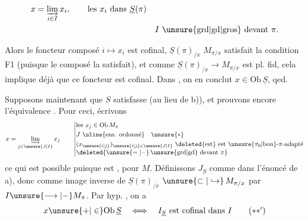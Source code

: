 
\[
\begin{aligned}
x&=\varinjlim_{i\in I}x_i,\qquad \text{les }x_i\text{ dans }\underline S(\pi)\\
&& I\ \unsure{\text{grd}|\text{gd}|\text{gros}}\text{ devant }\pi.
\end{aligned}
\]

Alors le foncteur composé $i\mapsto x_i$
est cofinal,   $\underline S(\pi)_{/x}$ \unsure{$-\!-$|$\longrightarrow$} $M_{\pi/x}$  satisfait la condition F1 (puisque le composé la satisfait), et comme $\underline S(\pi)_{/x}\longrightarrow M_{\pi/x}$ est pl. fid, cela implique déjà que ce foncteur est cofinal. Dans  , on en conclut $x\in\mathrm{Ob}\,\underline S$, qed.

Supposons maintenant que $S$ satisfasse  (au lieu de b)), et prouvons encore l'équivalence \unsure{$(*)$|$(**)$}. Pour ceci, écrivons
\[
 x=\varinjlim_{j\in\unsure{J|I}}x_j\qquad
 \left|\begin{aligned}
 &\text{les }x_j\in\mathrm{Ob}\,M_\pi\\
 &J\ \text{\uline{ens. ordonné}}\quad\unsure{*}\\
 &(x_{\unsure{i|j}})_{\unsure{i|j}\in\unsure{J|I}}\ \deleted{\text{est}}\ \text{est }\unsure{\pi_0|\text{bon}} \text{-}\pi\text{-adapté}\\[-2pt]
 &\deleted{\unsure{=|-}\,\unsure{\text{grd}|\text{gd}}\text{ devant }\pi}
 \end{aligned}\right.
\]
ce qui est possible puisque  est , pour $M$. \unsure{$]$} Définissons $J_{\underline S}$ comme dans l'énoncé de a), donc comme image inverse de $\underline S(\pi)_{/x}$ $\unsure{\subset|\hookrightarrow}\,M_{\pi/x}$ par $I\unsure{\longrightarrow|-}M_\pi$. Par hyp. , on a
\[
x\unsure{\mathord{+}|\in}\mathrm{Ob}\,\underline S\quad\Longleftrightarrow\quad I_{\underline S}\text{ est cofinal dans }I
\tag*{$(**')$}
\]

